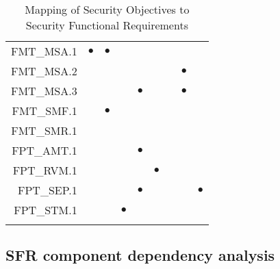 \documentclass[12pt,english]{scrbook}
\newcommand{\oh}{$\bullet$}
\begin{document}
\begin{longtable}{r|R|R|R|R|R|R|R|R}
FMT\_MSA.1                  & \oh  &  \oh         &         &           &          &             &              &              \\
FMT\_MSA.2                  &      &              &         &           &          &             &  \oh         &              \\
FMT\_MSA.3                  &      &              &         & \oh       &          &             &  \oh         &              \\
FMT\_SMF.1                  &      &  \oh         &         &           &          &             &              &              \\
FMT\_SMR.1                  &      &              &         &           &          &             &              &              \\
FPT\_AMT.1                  &      &              &         & \oh       &          &             &              &              \\
FPT\_RVM.1                  &      &              &         &           &  \oh     &             &              &              \\
FPT\_SEP.1                  &      &              &         &   \oh     &          &             &              &   \oh        \\
FPT\_STM.1                  &      &              &  \oh    &           &          &             &              &              \\
 \bottomrule
 \caption{Mapping of Security Objectives to Security Functional Requirements}
\end{longtable}

\subsection{SFR component dependency analysis}
\end{document}
